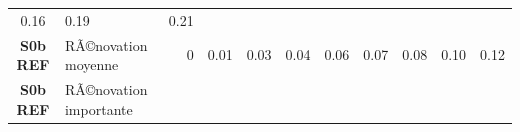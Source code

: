 \documentclass[]{article}
\begin{document}
\begin{longtable}[]{@{}clrrrrrrrrr@{}}
\begin{minipage}[t]{0.05\columnwidth}
0.16\strut
\end{minipage} & \begin{minipage}[t]{0.05\columnwidth}\raggedleft\strut
0.19\strut
\end{minipage} & \begin{minipage}[t]{0.05\columnwidth}\raggedleft\strut
0.21\strut
\end{minipage}\tabularnewline
\begin{minipage}[t]{0.12\columnwidth}\centering\strut
\textbf{S0b REF}\strut
\end{minipage} & \begin{minipage}[t]{0.17\columnwidth}\raggedright\strut
RÃ©novation moyenne\strut
\end{minipage} & \begin{minipage}[t]{0.05\columnwidth}\raggedleft\strut
0\strut
\end{minipage} & \begin{minipage}[t]{0.05\columnwidth}\raggedleft\strut
0.01\strut
\end{minipage} & \begin{minipage}[t]{0.05\columnwidth}\raggedleft\strut
0.03\strut
\end{minipage} & \begin{minipage}[t]{0.05\columnwidth}\raggedleft\strut
0.04\strut
\end{minipage} & \begin{minipage}[t]{0.05\columnwidth}\raggedleft\strut
0.06\strut
\end{minipage} & \begin{minipage}[t]{0.05\columnwidth}\raggedleft\strut
0.07\strut
\end{minipage} & \begin{minipage}[t]{0.05\columnwidth}\raggedleft\strut
0.08\strut
\end{minipage} & \begin{minipage}[t]{0.05\columnwidth}\raggedleft\strut
0.10\strut
\end{minipage} & \begin{minipage}[t]{0.05\columnwidth}\raggedleft\strut
0.12\strut
\end{minipage}\tabularnewline
\begin{minipage}[t]{0.12\columnwidth}\centering\strut
\textbf{S0b REF}\strut
\end{minipage} & \begin{minipage}[t]{0.17\columnwidth}\raggedright\strut
RÃ©novation importante\strut
\end{minipage} & \begin{minipage}[t]{0.05\columnwidth}\raggedleft\strut

\end{minipage}
\end{longtable}
\end{document}
